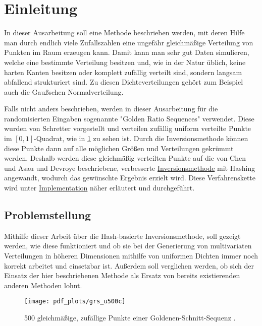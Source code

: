 \section{Einleitung}

In dieser Ausarbeitung soll eine Methode beschrieben werden, mit deren Hilfe man durch endlich viele Zufallszahlen 
eine ungefähr gleichmäßige Verteilung von Punkten im Raum erzeugen kann. Damit kann man sehr gut Daten simulieren, 
welche eine bestimmte Verteilung besitzen und, wie in der Natur üblich, keine harten Kanten besitzen oder komplett 
zufällig verteilt sind, sondern langsam abfallend strukturiert sind. Zu diesen Dichteverteilungen gehört zum Beispiel 
auch die Gaußschen Normalverteilung. 

Falls nicht anders beschrieben, werden in dieser Ausarbeitung für die randomisierten Eingaben sogenannte "Golden Ratio Sequences"
verwendet. Diese wurden von Schretter \cite{schretter-golden_ratio_sequences-2012} vorgestellt und verteilen zufällig 
uniform verteilte Punkte im $[0, 1]$-Quadrat, wie in \ref{fig:grs500} zu sehen ist. Durch die Inversionsmethode \cite{devroye-non_uniform_random_variate-1986} 
können diese Punkte dann auf alle möglichen Größen und Verteilungen gekrümmt werden. Deshalb werden diese gleichmäßig 
verteilten Punkte auf die von Chen und Asau \cite{chen_asau-generating_random_variates-1974} und Devroye 
\cite{devroye-non_uniform_random_variate-1986} beschriebene, verbesserte \hyperref[funktion]{Inversionsmethode} mit Hashing 
angewandt, wodurch das gewünschte Ergebnis erzielt wird. Diese Verfahrenskette wird unter \hyperref[impl]{Implementation} 
näher erläutert und durchgeführt. 


\subsection{Problemstellung}
Mithilfe dieser Arbeit über die Hash-basierte Inversionsmethode, soll gezeigt werden, wie diese funktioniert und ob  
sie bei der Generierung von multivariaten Verteilungen in höheren Dimensionen mithilfe von uniformen Dichten immer noch 
korrekt arbeitet und einsetzbar ist. Außerdem soll verglichen werden, ob sich der Einsatz der hier beschriebenen 
Methode als Ersatz von bereits existierenden anderen Methoden lohnt. 

\begin{figure}
    \centering
    \texttt{[image: pdf\_plots/grs\_u500c]}
    \caption{500 gleichmäßige, zufällige Punkte einer Goldenen-Schnitt-Sequenz \cite{schretter-golden_ratio_sequences-2012}.}
    \label{fig:grs500}
\end{figure}

